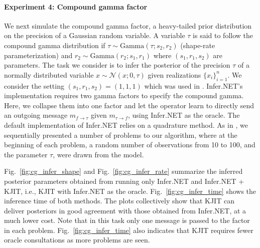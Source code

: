 \documentclass[english]{article}
\theoremstyle{plain}
\theoremstyle{plain}
\newcommand{\factor}{f}				%
\newcommand{\msg}[2]{m_{#1 \rightarrow #2}}			%
\newcommand{\figref}[1]{Fig.~\ref{#1}}
\begin{document}
\paragraph{Experiment 4: Compound gamma factor} We next simulate the compound gamma factor, %
 a heavy-tailed prior distribution on the precision of a Gaussian random variable.
A variable $\tau$ is said to follow the compound gamma distribution 
if $\tau \sim \text{Gamma}(\tau; s_2, r_2)$ (shape-rate parameterization) and 
$r_2 \sim \text{Gamma}(r_2; s_1, r_1)$ where $(s_1, r_1, s_2)$ are parameters. 
The task we consider is to infer the posterior of the precision $\tau$ of a normally 
distributed variable $x \sim \mathcal{N}(x; 0, \tau)$ given realizations 
$\{x_i\}_{i=1}^n$. We consider the setting $(s_1, r_1, s_2) = (1, 1, 1)$ which was 
used in \cite{Heess2013}. Infer.NET's implementation requires two gamma factors
to specify the compound gamma. Here, we collapse them into one factor 
and let the operator learn to directly send an outgoing message $\msg{\factor}{\tau}$ 
given $\msg{\tau}{\factor}$, using Infer.NET as the oracle. 
The  default implementation of Infer.NET relies on a quadrature method.
As in \cite{Eslami2014}, we sequentially presented a number of 
problems to our algorithm, where at the beginning of each problem, a random number of observations 
from 10 to 100, and the parameter $\tau$, were drawn from the model.

\figref{fig:cg_infer_shape} and \figref{fig:cg_infer_rate} summarize the inferred 
posterior parameters obtained from running only Infer.NET and Infer.NET + KJIT, i.e., 
KJIT with Infer.NET as the oracle. \figref{fig:cg_infer_time} shows the inference 
time of both methods. The plots collectively show that KJIT can deliver posteriors 
in good agreement with those obtained from Infer.NET, at a much lower cost. 
Note that in this task only one message is passed to the factor in each problem.
\figref{fig:cg_infer_time} also indicates that KJIT requires fewer oracle 
consultations as more problems are seen.

\end{document}
